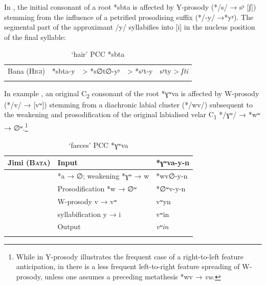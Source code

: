 \documentclass[output=paper]{langscibook}
\begin{document}
In  , the initial consonant of a root *sbta is affected by Y-prosody \mbox{(*/s/} → sʸ [ʃ]) stemming from the influence of a petrified prosodising suffix \mbox{(*/-y/} →*yʸ). The segmental part of the approximant /y/ syllabifies into [i] in the nucleus position of the final syllable:

\begin{table}
\caption{‘hair’ PCC *sbta}
\label{extab:wolff:12}
\begin{tabularx}{\textwidth}{XXXXl}
\lsptoprule
 Bana (\textsc{Higi}) & *sbta-y & > *s∅t∅-yʸ & > *sʸt-y & sʸty > \textit{ʃti} \\
 \lspbottomrule
\end{tabularx}
\end{table}

In example , an original C\textsubscript{2} consonant of the root *ɣʷva is affected by W-prosody (*/v/ → [vʷ]) stemming from a diachronic labial cluster (*/wv/) subsequent to the weakening and prosodification of the original labialised velar C\textsubscript{1} */ɣʷ/ → *wʷ → ∅ʷ.\footnote{While in  Y-prosody illustrates the frequent case of a right-to-left feature anticipation, in  there is a less frequent left-to-right feature spreading of W-prosody, unless one assumes a preceding metathesis *wv → \textit{vw}.}

\begin{table}
\caption{‘faeces’ PCC *ɣʷva}
\small
\label{extab:wolff:13}



\begin{tabularx}{\textwidth}{lll}
\lsptoprule
 Jimi (\textsc{Bata})&  Input                          & *ɣʷva-y-n\\
 \midrule
                     &  *a → ∅; weakening *ɣʷ → w              & *wv∅-y-n \\
                     &  Prosodification *w → ∅ʷ                & *∅ʷv-y-n\\
                     &  W-prosody v → vʷ                        & vʷyn\\
                     &syllabification y → i                     &  vʷin\\
                     \midrule
                     &  Output                         & \textit{vʷin}\\
\lspbottomrule
\end{tabularx}
\end{table}
\end{document}
